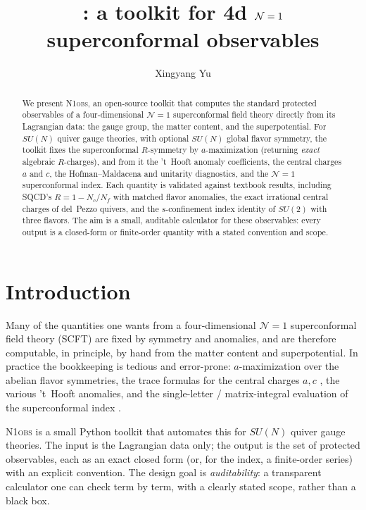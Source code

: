 \documentclass[11.5pt]{scrartcl}
\title{\toolname: a toolkit for 4d $\N=1$ superconformal observables}
\author[1]{Xingyang Yu}
\affil[1]{Department of Physics, Virginia Tech, Blacksburg, VA 24061, USA}
\date{}
\newcommand{\N}{\mathcal{N}}
\newcommand{\Nc}{N_c}
\newcommand{\Nf}{N_f}
\newcommand{\toolname}{\textsc{N1obs}}
\begin{document}
\maketitle

\begin{abstract}
We present \toolname, an open-source toolkit that computes the standard
protected observables of a four-dimensional $\N=1$ superconformal field theory
directly from its Lagrangian data: the gauge group, the matter content, and
the superpotential. For $SU(N)$ quiver gauge theories, with optional $SU(N)$
global flavor symmetry, the toolkit fixes the superconformal $R$-symmetry by
$a$-maximization (returning \emph{exact} algebraic $R$-charges), and from it
the 't~Hooft anomaly coefficients, the central charges $a$ and $c$, the
Hofman--Maldacena and unitarity diagnostics, and the $\N=1$ superconformal
index. Each quantity is validated against textbook results, including SQCD's
$R = 1-\Nc/\Nf$ with matched flavor anomalies, the exact irrational central
charges of del~Pezzo quivers, and the $s$-confinement index identity of
$SU(2)$ with three flavors. The aim is a small, auditable calculator for these
observables: every output is a closed-form or finite-order quantity with a
stated convention and scope.
\end{abstract}

\section{Introduction}

Many of the quantities one wants from a four-dimensional $\N=1$ superconformal
field theory (SCFT) are fixed by symmetry and anomalies, and are therefore
computable, in principle, by hand from the matter content and superpotential.
In practice the bookkeeping is tedious and error-prone: $a$-maximization
\cite{hep-th/0304128} over the abelian flavor symmetries, the trace formulas
for the central charges $a,c$ \cite{hep-th/9708042}, the various 't~Hooft
anomalies, and the single-letter / matrix-integral evaluation of the
superconformal index \cite{hep-th/0510060,0801.4947,1608.02965}.

\toolname{} is a small Python toolkit that automates this for $SU(N)$ quiver
gauge theories. The input is the Lagrangian data only; the output is the set
of protected observables, each as an exact closed form (or, for the index, a
finite-order series) with an explicit convention. The design goal is
\emph{auditability}: a transparent calculator one can check term by term, with
a clearly stated scope, rather than a black box.
\end{document}
